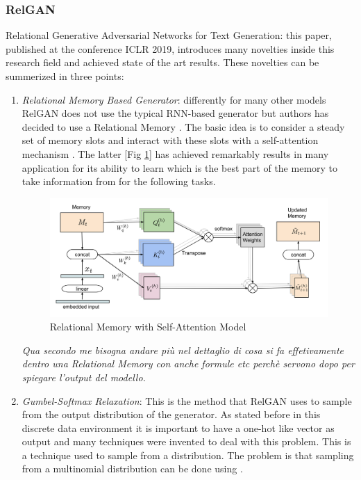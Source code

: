 \subsubsection[RelGAN]{RelGAN \cite{RelGAN}}
\label{sect:RelGAN}
Relational Generative Adversarial Networks for Text Generation: this paper, published at the conference ICLR 2019, introduces many novelties inside this research field and achieved state of the art results. These novelties can be summerized in three points:
\begin{enumerate}
	\item \textit{Relational Memory Based Generator}: differently for many other models RelGAN does not use the typical RNN-based generator but authors has decided to use a Relational Memory \cite{Santoro}. The basic idea is to consider a steady set of memory slots and interact with these slots with a self-attention mechanism \cite{Vaswani}. The latter [Fig \ref{img:RelationalMemory}] has achieved remarkably results in many application for its ability to learn which is the best part of the memory to take information from for the following tasks.
	
	\begin{figure}[h!]
		\centering
		\includegraphics[width=0.8\linewidth]{Images/RelationalMemorySelfAttention.png}
		\caption{Relational Memory with Self-Attention Model}
		\label{img:RelationalMemory}
	\end{figure}
	
	\textit{Qua secondo me bisogna andare più nel dettaglio di cosa si fa effetivamente dentro una Relational Memory con anche formule etc perchè servono dopo per spiegare l'output del modello.}
	
	\item \textit{Gumbel-Softmax Relaxation}: This is the method that RelGAN uses to sample from the output distribution of the generator. As stated before in this discrete data environment it is important to have a one-hot like vector as output and many techniques were invented to deal with this problem. This is a technique used to sample from a distribution. The problem is that sampling from a multinomial distribution can be done using .
	

\end{enumerate}
